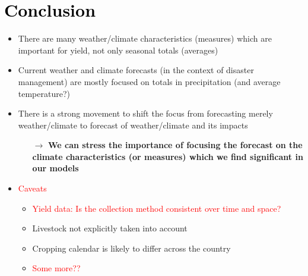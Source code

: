 \documentclass[a4paper,12pt]{article}
\begin{document}
		
		\color{blue}
\section{\textcolor{black}{Conclusion}}\label{Conclusion}

	\begin{itemize}
	\item There are many weather/climate characteristics (measures) which are important for yield, not only seasonal totals (averages)
	\item  Current weather and climate forecasts (in the context of disaster management) are mostly focused on totals in precipitation (and average temperature?) 
	\item There is a strong movement to shift the focus from forecasting merely weather/climate to forecast of weather/climate and its impacts
	
	\begin{itemize}
	\item[$\boldsymbol{\rightarrow}$] \textbf{We can stress the importance of focusing the forecast on the climate characteristics (or measures) which we find significant in our models}
\end{itemize}

	\item \textcolor{red}{Caveats}
	
	\begin{itemize}
	\item\textcolor{red}{ Yield data: Is the collection method consistent over time and space?}
	\item Livestock not explicitly taken into account
	\item Cropping calendar is likely to differ across the country 
	\item \textcolor{red}{Some more??}
	
	\end{itemize}
\end{itemize}
\color{black}

\FloatBarrier
\pagebreak






\end{document}
